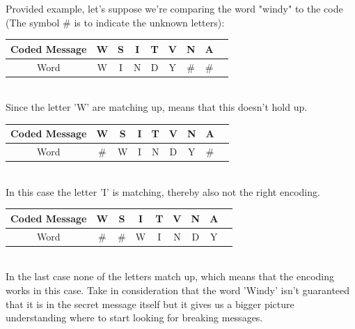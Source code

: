 \documentclass[conference,compsoc]{IEEEtran}
\begin{document}
Provided example, let's suppose we're comparing the word "windy" to the code (The symbol \# is to indicate the unknown letters):\\

\begin{tabular}{ |c|c|c|c|c|c|c|c|c| }
 \hline
 Coded Message & \cellcolor{red!35}W & S & I & T & V & N & A \\ 
 \hline
 Word & \cellcolor{red!35}W & \cellcolor{green!35}I & \cellcolor{green!35}N & \cellcolor{green!35}D & \cellcolor{green!35}Y & \# & \# \\
 \hline
\end{tabular}\\

Since the letter 'W' are matching up, means that this doesn't hold up.\\

\begin{tabular}{ |c|c|c|c|c|c|c|c|c| }
 \hline
 Coded Message & W & S & \cellcolor{red!35}I & T & V & N & A \\ 
 \hline
 Word & \# & \cellcolor{green!35}W & \cellcolor{red!35}I & \cellcolor{green!35}N & \cellcolor{green!35}D & \cellcolor{green!35}Y & \# \\
 \hline
\end{tabular}\\

In this case the letter 'I' is matching, thereby also not the right encoding.\\

\begin{tabular}{ |c|c|c|c|c|c|c|c|c| }
 \hline
 Coded Message & W & S & I & T & V & N & A \\ 
 \hline
 Word & \# & \# & \cellcolor{green!35}W & \cellcolor{green!35}I & \cellcolor{green!35}N & \cellcolor{green!35}D & \cellcolor{green!35}Y \\
 \hline
\end{tabular}\\


In the last case none of the letters match up, which means that the encoding works in this case. Take in consideration that the word 'Windy' isn't guaranteed that it is in the secret message itself but it gives us a bigger picture understanding where to start looking for breaking messages.\\
\end{document}
